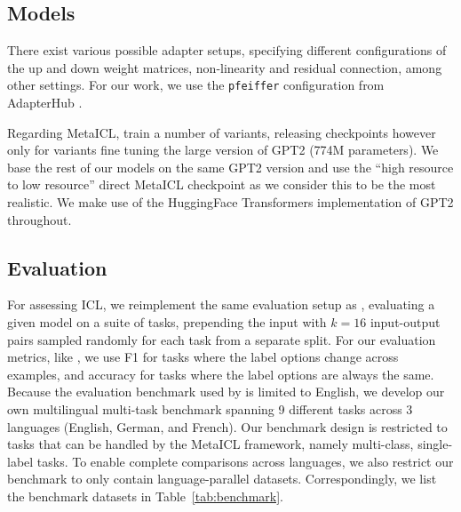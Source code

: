 \documentclass[11pt]{article}
\begin{document}
\subsection{Models}

There exist various possible adapter setups, specifying different configurations of the up and down
weight matrices, non-linearity and residual connection, among other settings. For our work, we use
the \verb_pfeiffer_ configuration from AdapterHub \citep{pfeiffer_adapterhub_2020}.

Regarding MetaICL, \citet{min_metaicl_2022} train a number of variants, releasing checkpoints
however only for variants fine tuning the large version of GPT2 (774M parameters). We base the rest
of our models on the same GPT2 version and use the ``high resource to low resource'' direct MetaICL
checkpoint as we consider this to be the most realistic. We make use of the HuggingFace Transformers
\citep{wolf_transformers_2020} implementation of GPT2 throughout.

\subsection{Evaluation}\label{sec:experiment:eval}

For assessing ICL, we reimplement the same evaluation setup as \citet{min_metaicl_2022}, evaluating
a given model on a suite of tasks, prepending the input with $k=16$ input-output pairs sampled
randomly for each task from a separate split. For our evaluation metrics, like
\citet{min_metaicl_2022}, we use F1 for tasks where the label options change across examples, and
accuracy for tasks where the label options are always the same. Because the evaluation benchmark
used by \citet{min_metaicl_2022} is limited to English, we develop our own multilingual multi-task
benchmark spanning 9 different tasks across 3 languages (English, German, and French). Our benchmark
design is restricted to tasks that can be handled by the MetaICL framework, namely multi-class,
single-label tasks. To enable complete comparisons across languages, we also restrict our benchmark
to only contain language-parallel datasets. Correspondingly, we list the benchmark datasets in
Table~\ref{tab:benchmark}.
\end{document}
